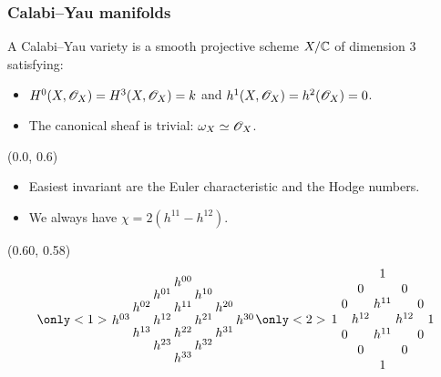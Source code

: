 \begin{frame}
\frametitle{Calabi--Yau manifolds}

\begin{definition}
A Calabi--Yau variety is a smooth projective scheme $X/\mathbb C$ of dimension $3$ satisfying:
\begin{itemize}
	\item $H^0(X,\mathscr{O}_X)=H^3(X,\mathscr{O}_X)=k$ and $h^1(X,\mathscr{O}_X)=h^2(\mathscr{O}_X)=0$.
	\item The canonical sheaf is trivial: $\omega_X \simeq \mathscr{O}_X$. 
\end{itemize}
\end{definition}

\begin{textblock}{0.5}(0.0, 0.6)
\begin{itemize}
	\item Easiest invariant are the Euler characteristic and the Hodge numbers.

	\item We always have $\chi = 2(h^{11}-h^{12})$. 
\end{itemize}
\end{textblock}

    \begin{textblock}{0.4}(0.60, 0.58)
    \[
    \only<1>{
   \arraycolsep=1pt\def\arraystretch{0.5}
\begin{array}[c]{ccccccc}
&&&               h^{00} \\  
 &         & h^{01} & & h^{10}  \\
&	h^{02} && h^{11}  && h^{20}  \\
   h^{03} && h^{12} && h^{21} && h^{30} \\
&	h^{13} && h^{22}  && h^{31}  \\
 &         & h^{23} & & h^{32}  \\
                &&& h^{33} 
\end{array}
}
\only<2>{
\arraycolsep=1.5pt\def\arraystretch{1}
\begin{array}[c]{ccccccc}
&&& 1 \\  
 &         & 0 & & 0  \\
&	0 && h^{11}  && 0  \\
1 && h^{12} && h^{12} && 1 \\
&	0 && h^{11}  && 0  \\
 &         & 0 & & 0  \\
 &&& 1 
\end{array}
}
\]

\end{textblock}

\end{frame}